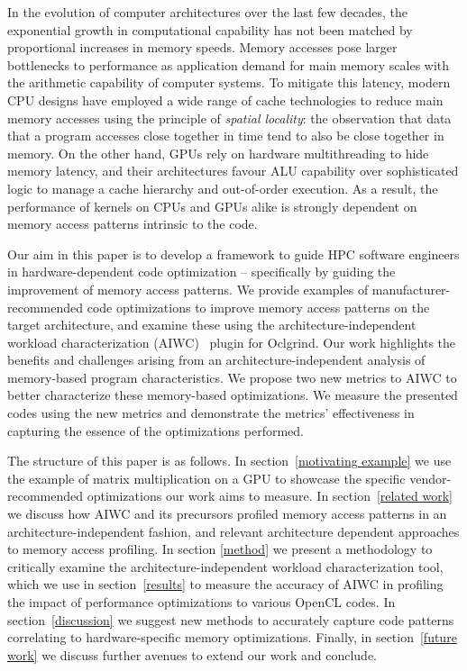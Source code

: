 \documentclass[review=false, sigchi]{acmart}
\begin{document}
	In the evolution of computer architectures over the last few decades, the exponential growth in computational capability has not been matched by proportional increases in memory speeds\cite{hennessycomparch}.
	Memory accesses pose larger bottlenecks to performance as application demand for main memory scales with the arithmetic capability of computer systems.
	To mitigate this latency, modern CPU designs have employed a wide range of cache technologies to reduce main memory accesses using the principle of \emph{spatial locality}: the observation that data that a program accesses close together in time tend to also be close together in memory.
	On the other hand, GPUs rely on hardware multithreading to hide memory latency, and their architectures favour ALU capability over sophisticated logic to manage a cache hierarchy and out-of-order execution. As a result, the performance of kernels on CPUs and GPUs alike is strongly dependent on memory access patterns intrinsic to the code. %
	
	
	
	Our aim in this paper is to develop a framework to guide HPC software engineers in hardware-dependent code optimization -- specifically by guiding the improvement of memory access patterns.
	We provide examples of manufacturer-recommended code optimizations to improve memory access patterns on the target architecture, and examine these using the architecture-independent workload characterization (AIWC)~\cite{beauaiwc} plugin for Oclgrind.
	Our work highlights the benefits and challenges arising from an architecture-independent analysis of memory-based program characteristics.
	We propose two new metrics to AIWC to better characterize these memory-based optimizations.
	We measure the presented codes using the new metrics and demonstrate the metrics' effectiveness in capturing the essence of the optimizations performed.
	
	The structure of this paper is as follows.
	In section~\ref{motivating example} we use the example of matrix multiplication on a GPU to showcase the specific vendor-recommended optimizations our work aims to measure.
	In section~\ref{related work} we discuss how AIWC and its precursors profiled memory access patterns in an architecture-independent fashion, and relevant architecture dependent approaches to memory access profiling.
	In section \ref{method} we present a methodology to critically examine the architecture-independent workload characterization tool, which we use in section~\ref{results} to measure the accuracy of AIWC in profiling the impact of performance optimizations to various OpenCL codes.
	In section~\ref{discussion} we suggest new methods to accurately capture code patterns correlating to hardware-specific memory optimizations.
	Finally, in section~\ref{future work} we discuss further avenues to extend our work and conclude.
	
\end{document}
